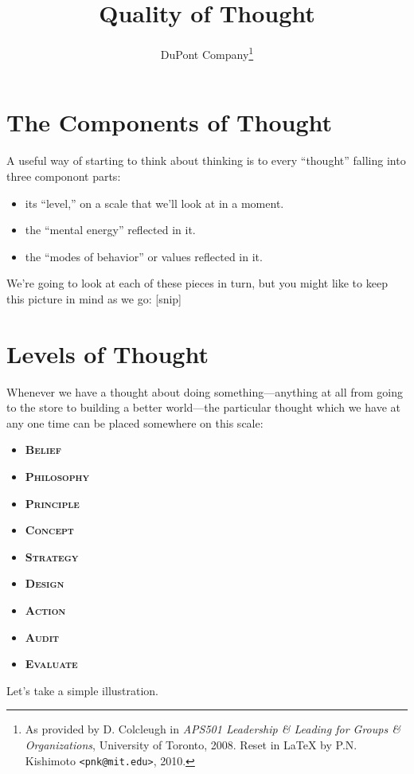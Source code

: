 \documentclass[a5paper]{article}
\title{Quality of Thought}
\author{DuPont Company\footnote{As provided by D. Colcleugh in \emph{APS501 Leadership \& Leading for Groups \& Organizations}, University of Toronto, 2008. Reset in LaTeX by P.N. Kishimoto \texttt{<pnk@mit.edu>}, 2010.}}
\date{}
\begin{document}
\maketitle
\thispagestyle{empty}

\section*{The Components of Thought}
A useful way of starting to think about thinking is to every ``thought'' falling into three componont parts:
\begin{itemize}
  \item its ``level,'' on a scale that we'll look at in a moment.
  \item the ``mental energy'' reflected in it.
  \item the ``modes of behavior'' or values reflected in it.
\end{itemize}
We're going to look at each of these pieces in turn, but you might like to keep this picture in mind as we go: [snip]


\section{Levels of Thought}
Whenever we have a thought about doing something---anything at all from going to the store to building a better world---the particular thought which we have at any one time can be placed somewhere on this scale:
\begin{itemize} \setlength{\itemsep}{0pt}\setlength{\parskip}{0pt}
  \item \textbf{\scshape Belief}
  \item \textbf{\scshape Philosophy}
  \item \textbf{\scshape Principle}
  \item \textbf{\scshape Concept}
  \item \textbf{\scshape Strategy}
  \item \textbf{\scshape Design}
  \item \textbf{\scshape Action}
  \item \textbf{\scshape Audit}
  \item \textbf{\scshape Evaluate}
\end{itemize}
Let's take a simple illustration.
\end{document}
